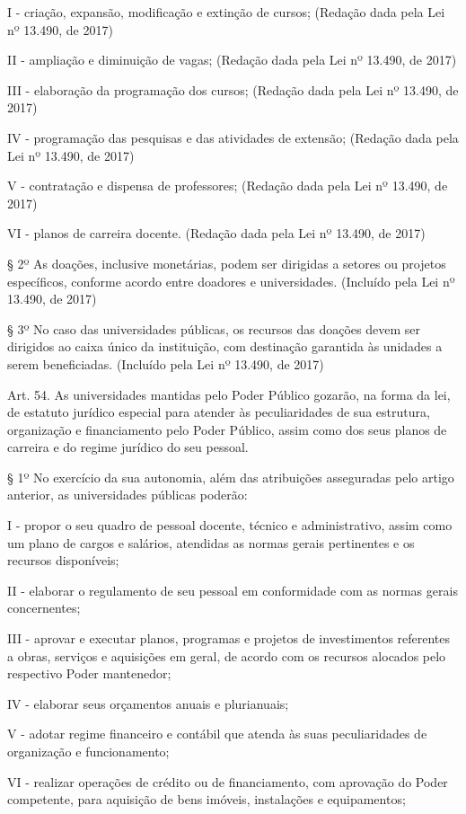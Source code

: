 \documentclass[
]{book}
\begin{document}
I - criação, expansão, modificação e extinção de cursos; (Redação dada pela Lei nº 13.490, de 2017)

II - ampliação e diminuição de vagas; (Redação dada pela Lei nº 13.490, de 2017)

III - elaboração da programação dos cursos; (Redação dada pela Lei nº 13.490, de 2017)

IV - programação das pesquisas e das atividades de extensão; (Redação dada pela Lei nº 13.490, de 2017)

V - contratação e dispensa de professores; (Redação dada pela Lei nº 13.490, de 2017)

VI - planos de carreira docente. (Redação dada pela Lei nº 13.490, de 2017)

§ 2º As doações, inclusive monetárias, podem ser dirigidas a setores ou projetos específicos, conforme acordo entre doadores e universidades. (Incluído pela Lei nº 13.490, de 2017)

§ 3º No caso das universidades públicas, os recursos das doações devem ser dirigidos ao caixa único da instituição, com destinação garantida às unidades a serem beneficiadas. (Incluído pela Lei nº 13.490, de 2017)

Art. 54. As universidades mantidas pelo Poder Público gozarão, na forma da lei, de estatuto jurídico especial para atender às peculiaridades de sua estrutura, organização e financiamento pelo Poder Público, assim como dos seus planos de carreira e do regime jurídico do seu pessoal.

§ 1º No exercício da sua autonomia, além das atribuições asseguradas pelo artigo anterior, as universidades públicas poderão:

I - propor o seu quadro de pessoal docente, técnico e administrativo, assim como um plano de cargos e salários, atendidas as normas gerais pertinentes e os recursos disponíveis;

II - elaborar o regulamento de seu pessoal em conformidade com as normas gerais concernentes;

III - aprovar e executar planos, programas e projetos de investimentos referentes a obras, serviços e aquisições em geral, de acordo com os recursos alocados pelo respectivo Poder mantenedor;

IV - elaborar seus orçamentos anuais e plurianuais;

V - adotar regime financeiro e contábil que atenda às suas peculiaridades de organização e funcionamento;

VI - realizar operações de crédito ou de financiamento, com aprovação do Poder competente, para aquisição de bens imóveis, instalações e equipamentos;
\end{document}
